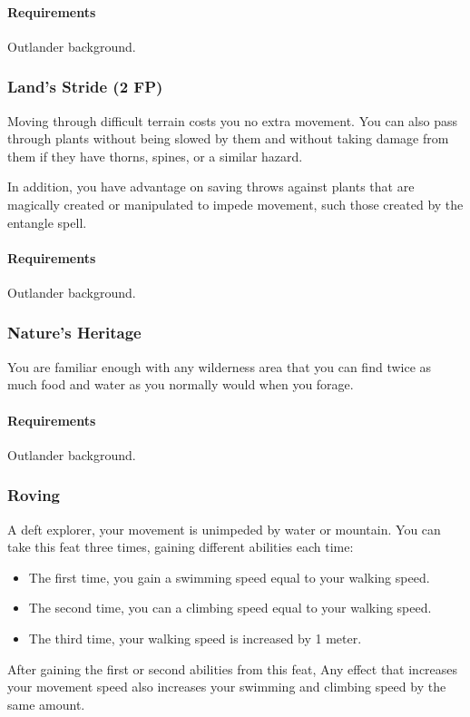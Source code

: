         \paragraph{Requirements} Outlander background.
        \subsubsection{Land's Stride (2 FP)} \label{feat::landsstride}
        Moving through difficult terrain costs you no extra movement.
        You can also pass through plants without being slowed by them and without taking damage from them if they have thorns, spines, or a similar hazard.

        In addition, you have advantage on saving throws against plants that are magically created or manipulated to impede movement, such those created by the entangle spell.
        \paragraph{Requirements} Outlander background.
        \subsubsection{Nature's Heritage} \label{feat::naturesheritage}
        You are familiar enough with any wilderness area that you can find twice as much food and water as you normally would when you forage.
        \paragraph{Requirements} Outlander background.
        \subsubsection{Roving} \label{feat::roving}
        A deft explorer, your movement is unimpeded by water or mountain.
        You can take this feat three times, gaining different abilities each time:
        \begin{itemize}
            \item The first time, you gain a swimming speed equal to your walking speed.
            \item The second time, you can a climbing speed equal to your walking speed.
            \item The third time, your walking speed is increased by 1 meter.
        \end{itemize}
        After gaining the first or second abilities from this feat, Any effect that increases your movement speed also increases your swimming and climbing speed by the same amount.
